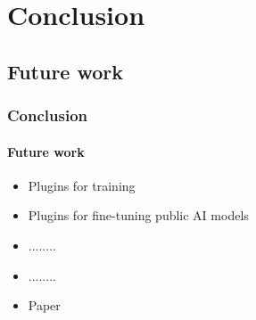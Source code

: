 \def\sectiontitle{Conclusion}

\section{\sectiontitle}

\def\slidetitle{Future work}

\subsection{\slidetitle}
\begin{frame}
  \frametitle{\sectiontitle}
  \framesubtitle{\slidetitle}

  \begin{itemize}
    \item Plugins for training
    \item Plugins for fine-tuning public AI models
    \item ........
    \item ........
    \item Paper
  \end{itemize}

\end{frame}
